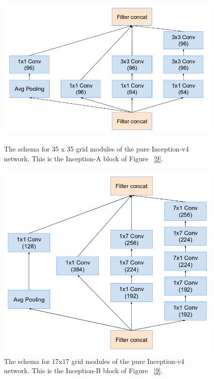 \documentclass[a4paper,12pt, twoside]{NITKReport}
\begin{document}
\begin{figure}[h]
\centering

    \includegraphics[height=8cm,width=15cm]{figure4.png}
    \caption{The  schema  for 35 x 35 grid  modules of the pure Inception-v4 network. This is the Inception-A block of Figure ~\ref{9}.}
    \label{4}
  
\end{figure}



\begin{figure}[h]
  \centering
  
    \includegraphics[height=10cm,width=15cm]{figure5.png}
    \caption{The  schema  for 17x17 grid  modules  of  the  pure Inception-v4 network. This is the Inception-B block of Figure ~\ref{9}.}
    \label{5}
 
 \end{figure}
 
\end{document}
